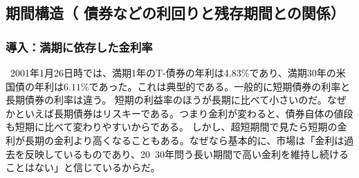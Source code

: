 \documentclass[dvipdfmx,autodetect-engine]{jsarticle}
\begin{document}
\subsection{期間構造（ 債券などの利回りと残存期間との関係）}
\subsubsection{導入：満期に依存した金利率}
\ 2001年1月26日時では、満期1年のT-債券の年利は4.83$\%$であり、満期30年の米国債の年利は$6.11\%$であった。これは典型的である。一般的に短期債券の利率と長期債券の利率は違う。
短期の利益率のほうが長期に比べて小さいのだ。なぜかといえば長期債券はリスキーである。つまり金利が変わると、債券自体の値段も短期に比べて変わりやすいからである。
しかし、超短期間で見たら短期の金利が長期の金利より高くなることもある。なぜなら基本的に、市場は「金利は過去を反映しているものであり、20~30年問う長い期間で高い金利を維持し続けることはない」と信じているからだ。
\end{document}
